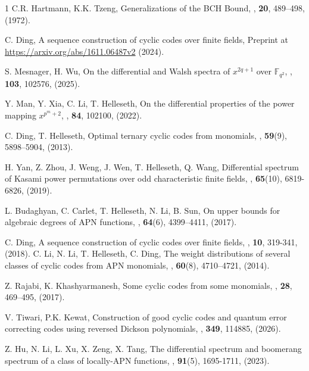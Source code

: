 \documentclass[pdflatex,sn-mathphys-num]{sn-jnl}%
\theoremstyle{thmstyleone}%
\theoremstyle{thmstyletwo}%
\theoremstyle{thmstylethree}%
\begin{document}
\begin{thebibliography}{1}
C.R. Hartmann, K.K. Tzeng, \newblock Generalizations of the BCH Bound, , \textbf{20}, 489–498, (1972).

C. Ding, \newblock A sequence construction of cyclic codes over finite fields, Preprint at \url{https://arxiv.org/abs/1611.06487v2} (2024).

S. Mesnager, H. Wu, \newblock On the differential and Walsh spectra of $x^{2q+1}$ over $\mathbb{F}_{q^2}$, , \textbf{103}, 102576, (2025).

Y. Man, Y. Xia, C. Li, T. Helleseth, \newblock On the differential properties of the power mapping $x^{p^m+2}$, , \textbf{84}, 102100, (2022).

C. Ding, T. Helleseth, \newblock Optimal ternary cyclic codes from monomials, , \textbf{59}(9), 5898–5904, (2013).

H. Yan, Z. Zhou, J. Weng, J. Wen, T. Helleseth, Q. Wang, \newblock Differential spectrum of Kasami power permutations over odd characteristic finite fields, , \textbf{65}(10), 6819-6826, (2019).  

L. Budaghyan, C. Carlet, T. Helleseth, N. Li, B. Sun, \newblock On upper bounds for algebraic degrees of APN functions, , \textbf{64}(6), 4399–4411, (2017).

C. Ding, \newblock A sequence construction of cyclic codes over finite fields, , \textbf{10}, 319-341, (2018).
C. Li, N. Li, T. Helleseth, C. Ding, \newblock The weight distributions of several classes of cyclic codes from APN monomials, , \textbf{60}(8), 4710–4721, (2014).

Z. Rajabi, K. Khashyarmanesh, \newblock Some cyclic codes from some monomials,  , \textbf{28}, 469–495, (2017).

V. Tiwari, P.K. Kewat, \newblock Construction of good cyclic codes and quantum error correcting codes using reversed Dickson polynomials, , \textbf{349}, 114885, (2026).

Z. Hu, N. Li, L. Xu, X. Zeng, X. Tang, \newblock The differential spectrum and boomerang spectrum of a class of locally-APN functions, , \textbf{91}(5), 1695-1711, (2023). 


\end{thebibliography}
\end{document}
